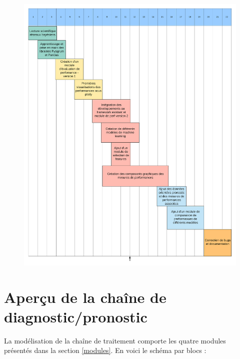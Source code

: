 \begin{figure}
  \centering
  \includegraphics[width=1\textwidth]{figures/Rapport_GANTT.png}
  \label{diagramme_gantt}
\end{figure}

\clearpage

\section{Aperçu de la chaîne de diagnostic/pronostic}

La modélisation de la chaîne de traitement comporte les quatre modules présentés dans la section \ref{modules}. En voici le schéma par blocs :


